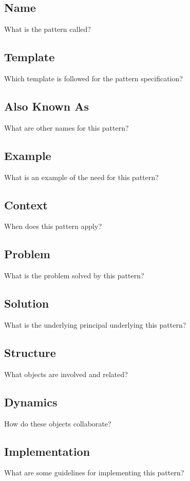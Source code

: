 \documentclass{article}
\begin{document}
\subsection{Name}
What is the pattern called?

\subsection{Template}
Which template is followed for the pattern specification?

\subsection{Also Known As}
What are other names for this pattern?

\subsection{Example}
What is an example of the need for this pattern?

\subsection{Context}
When does this pattern apply?

\subsection{Problem}
What is the problem solved by this pattern?

\subsection{Solution}
What is the underlying principal underlying this pattern?

\subsection{Structure}
What objects are involved and related?

\subsection{Dynamics}
How do these objects collaborate?

\subsection{Implementation}
What are some guidelines for implementing this pattern?
\end{document}
